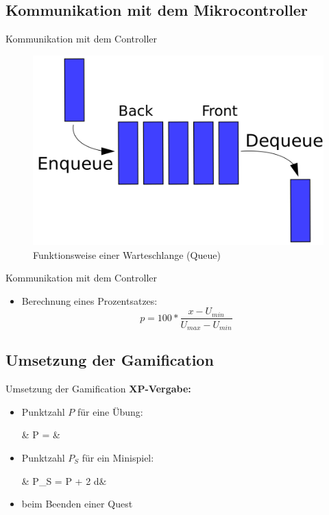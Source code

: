 \documentclass[hyphens]{beamer}
\begin{document}
\subsection{Kommunikation mit dem Mikrocontroller}

\begin{frame}{Kommunikation mit dem Controller}
	\begin{figure}
		\includegraphics[scale=0.28]{pics/queue}
		\caption{Funktionsweise einer Warteschlange (Queue)}
	\end{figure}
\end{frame}

\begin{frame}{Kommunikation mit dem Controller}
\begin{itemize}
	\item Berechnung eines Prozentsatzes:
	\begin{equation*}
	p = 100 * \frac{x - U_{min}}{U_{max} - U_{min}}
	\end{equation*}
\end{itemize}
\end{frame}

\subsection{Umsetzung der Gamification}

\begin{frame}{Umsetzung der Gamification}
\textbf{XP-Vergabe:}
\begin{itemize}
	\item Punktzahl $P$ für eine Übung:
	\begin{flalign*}
	& P = &
	\end{flalign*}
	\item Punktzahl $P_{S}$ für ein Minispiel:
	\begin{flalign*}
	& P_{S} = P + 2 \cdot d&
	\end{flalign*}
	\item beim Beenden einer Quest
\end{itemize}
\end{frame}
\end{document}

